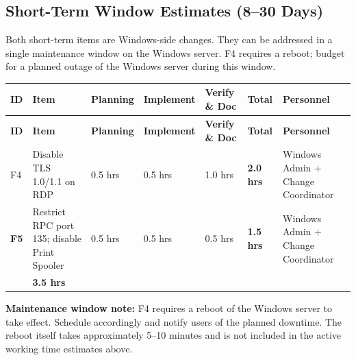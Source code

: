 \documentclass[12pt]{article}
\begin{document}
\subsection{Short-Term Window Estimates (8--30 Days)}
 
Both short-term items are Windows-side changes. They can be addressed in a
single maintenance window on the Windows server. F4 requires a reboot;
budget for a planned outage of the Windows server during this window.
 
\bigskip
 
\noindent
\begin{longtable}{>{\bfseries}p{1.0cm} p{2.8cm} p{1.4cm} p{1.4cm} p{1.6cm} p{1.4cm} p{2.0cm}}
  \rowcolor{headercol}
  \color{white}\textbf{ID} &
  \color{white}\textbf{Item} &
  \color{white}\textbf{Planning} &
  \color{white}\textbf{Implement} &
  \color{white}\textbf{Verify \& Doc} &
  \color{white}\textbf{Total} &
  \color{white}\textbf{Personnel} \\
  \endfirsthead
  \rowcolor{headercol}
  \color{white}\textbf{ID} &
  \color{white}\textbf{Item} &
  \color{white}\textbf{Planning} &
  \color{white}\textbf{Implement} &
  \color{white}\textbf{Verify \& Doc} &
  \color{white}\textbf{Total} &
  \color{white}\textbf{Personnel} \\
  \endhead
  \midrule
 
  F4 &
  Disable TLS 1.0/1.1 on RDP &
  0.5 hrs &
  0.5 hrs &
  1.0 hrs &
  \textbf{2.0 hrs} &
  Windows Admin + Change Coordinator \\[4pt]
 
  F5 &
  Restrict RPC port 135; disable Print Spooler &
  0.5 hrs &
  0.5 hrs &
  0.5 hrs &
  \textbf{1.5 hrs} &
  Windows Admin + Change Coordinator \\[4pt]
 
  \rowcolor{totalrowcol}
  \multicolumn{5}{l}{\textbf{Short-term window total}} &
  \textbf{3.5 hrs} &
  \\[2pt]
 
  \bottomrule
\end{longtable}
 
\begin{impactbox}
\textbf{Maintenance window note:} F4 requires a reboot of the Windows server
to take effect. Schedule accordingly and notify users of the planned
downtime. The reboot itself takes approximately 5--10 minutes and is not
included in the active working time estimates above.
\end{impactbox}
 
\end{document}
